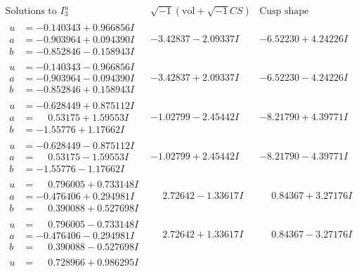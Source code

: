 \documentclass[1p]{elsarticle_modified}
\theoremstyle{definition}
\newcommand{\I}{\sqrt{-1}}
\begin{document}
$$\begin{array}{c|c|c}  
\text{Solutions to }I^u_{3}& \I (\text{vol} + \sqrt{-1}CS) & \text{Cusp shape}\\
 \hline 
\begin{aligned}
u &= -0.140343 + 0.966856 I \\
a &= -0.903964 + 0.094390 I \\
b &= -0.852846 - 0.158943 I\end{aligned}
 & -3.42837 - 2.09337 I & -6.52230 + 4.24226 I \\ \hline\begin{aligned}
u &= -0.140343 - 0.966856 I \\
a &= -0.903964 - 0.094390 I \\
b &= -0.852846 + 0.158943 I\end{aligned}
 & -3.42837 + 2.09337 I & -6.52230 - 4.24226 I \\ \hline\begin{aligned}
u &= -0.628449 + 0.875112 I \\
a &= \phantom{-}0.53175 + 1.59553 I \\
b &= -1.55776 + 1.17662 I\end{aligned}
 & -1.02799 - 2.45442 I & -8.21790 + 4.39771 I \\ \hline\begin{aligned}
u &= -0.628449 - 0.875112 I \\
a &= \phantom{-}0.53175 - 1.59553 I \\
b &= -1.55776 - 1.17662 I\end{aligned}
 & -1.02799 + 2.45442 I & -8.21790 - 4.39771 I \\ \hline\begin{aligned}
u &= \phantom{-}0.796005 + 0.733148 I \\
a &= -0.476406 + 0.294981 I \\
b &= \phantom{-}0.390088 + 0.527698 I\end{aligned}
 & \phantom{-}2.72642 - 1.33617 I & \phantom{-}0.84367 + 3.27176 I \\ \hline\begin{aligned}
u &= \phantom{-}0.796005 - 0.733148 I \\
a &= -0.476406 - 0.294981 I \\
b &= \phantom{-}0.390088 - 0.527698 I\end{aligned}
 & \phantom{-}2.72642 + 1.33617 I & \phantom{-}0.84367 - 3.27176 I \\ \hline\begin{aligned}
u &= \phantom{-}0.728966 + 0.986295 I \\

\end{aligned}
\end{array}$$
\end{document}
